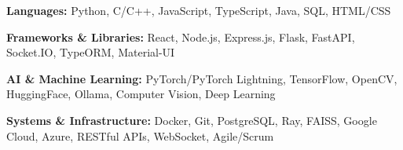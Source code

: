 \vspace{-1.0mm}

\begin{cventries}

  \cvend
    {
      \begin{cvitems} %
        \item {\textbf{Languages:} Python, C/C++, JavaScript, TypeScript, Java, SQL, HTML/CSS}
        \item {\textbf{Frameworks \& Libraries:} React, Node.js, Express.js, Flask, FastAPI, Socket.IO, TypeORM, Material-UI}
        \item {\textbf{AI \& Machine Learning:} PyTorch/PyTorch Lightning, TensorFlow, OpenCV, HuggingFace, Ollama, Computer Vision, Deep Learning}
        \item {\textbf{Systems \& Infrastructure:} Docker, Git, PostgreSQL, Ray, FAISS, Google Cloud, Azure, RESTful APIs, WebSocket, Agile/Scrum}
      \end{cvitems}
    }

\end{cventries}
